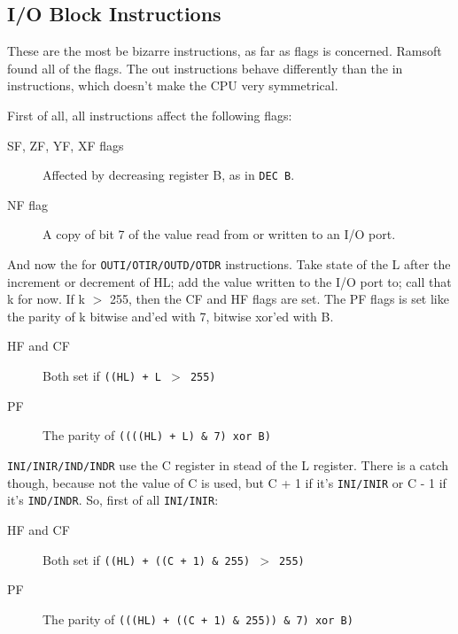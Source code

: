 \documentclass[12pt,twoside,openright,a4paper]{book}
\begin{document}
\subsection{I/O Block Instructions}
\label{block_io}

These are the most be bizarre instructions, as far as flags is concerned. Ramsoft found all of the flags. The out instructions behave differently than the in instructions, which doesn't make the CPU very symmetrical. 

First of all, all instructions affect the following flags:

\begin{description}

	\item[SF, ZF, YF, XF flags]
	Affected by decreasing register B, as in {\tt DEC B}.

	\item[NF flag]
	A copy of bit 7 of the value read from or written to an I/O port.

\end{description}

\pagebreak	%

And now the for {\tt OUTI/OTIR/OUTD/OTDR} instructions. Take state of the L after the increment or decrement of HL; add the value written to the I/O port to; call that k for now. If k $>$ 255, then the CF and HF flags are set. The PF flags is set like the parity of k bitwise and'ed with 7, bitwise xor'ed with B.

\begin{description}

	\item[HF and CF]
	Both set if {\tt ((HL) + L  $>$ 255)}

	\item[PF]
	The parity of {\tt ((((HL) + L) \& 7) xor B)}

\end{description}

{\tt INI/INIR/IND/INDR} use the C register in stead of the L register. There is a catch though, because not the value of C is used, but C + 1 if it's {\tt INI/INIR} or C - 1 if it's {\tt IND/INDR}. So, first of all {\tt INI/INIR}:

\begin{description}

	\item[HF and CF]
	Both set if {\tt ((HL) + ((C + 1) \& 255)  $>$ 255)}

	\item[PF]
	The parity of {\tt (((HL) + ((C + 1) \& 255)) \& 7) xor B)}

\end{description}
\end{document}
